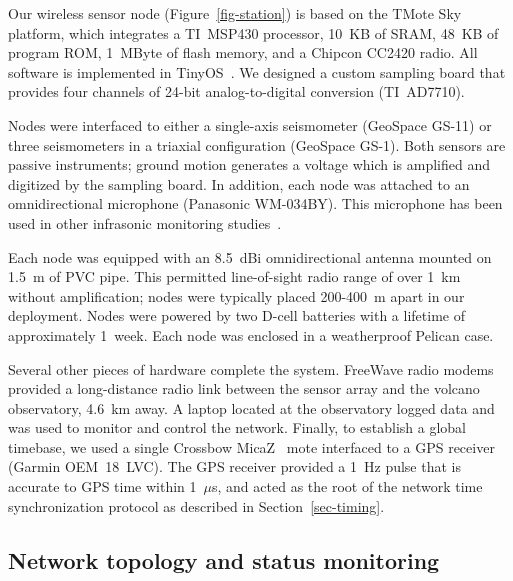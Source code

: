 Our wireless sensor node (Figure~\ref{fig-station})
is based on the TMote Sky~\cite{moteiv} 
platform, which integrates a TI~MSP430 processor, 10~KB of SRAM,
48~KB of program ROM, 1~MByte of flash memory, and a Chipcon 
CC2420 radio. All software is implemented in TinyOS~\cite{tinyos-asplos00}.
We designed a custom sampling board that 
provides four channels of 24-bit analog-to-digital 
conversion (TI~AD7710). 

Nodes were interfaced to either a single-axis seismometer
(GeoSpace GS-11) or three seismometers in 
a triaxial configuration (GeoSpace GS-1). 
Both sensors are
passive instruments; ground motion generates a voltage which is 
amplified and digitized by the sampling board. 
In addition, each node was attached to an
omnidirectional microphone (Panasonic WM-034BY). This microphone has
been used in other infrasonic monitoring studies~\cite{johnson-etal-04b}.

Each node was equipped with an 8.5~dBi omnidirectional antenna 
mounted on 1.5~m of PVC pipe. 
This permitted line-of-sight radio range of over 1~km 
without amplification; nodes were typically placed 200-400~m apart 
in our deployment. Nodes were powered by two D-cell batteries with 
a lifetime of approximately 1~week.  
Each node was enclosed in a weatherproof Pelican case.

Several other pieces of hardware complete the system. FreeWave radio 
modems provided a long-distance radio link between the
sensor array and the volcano observatory, 4.6~km away. A laptop 
located at the observatory logged data and was used to
monitor and control the network.  Finally, to establish
a global timebase, we used a single Crossbow MicaZ~\cite{xbow} mote
interfaced to a GPS receiver (Garmin OEM~18~LVC).  The GPS receiver
provided a 1~Hz pulse that is accurate to GPS time within 1~$\mu$s,
and acted as the root of the network time synchronization protocol as
described in Section~\ref{sec-timing}.

\subsection{Network topology and status monitoring}

